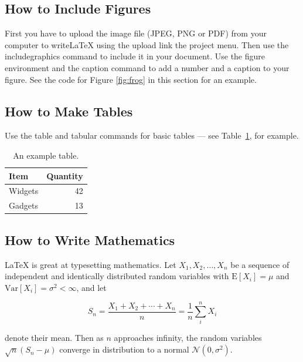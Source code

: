 \documentclass[a4paper]{article}
\begin{document}
\subsection{How to Include Figures}

First you have to upload the image file (JPEG, PNG or PDF) from your computer to writeLaTeX using the upload link the project menu. Then use the includegraphics command to include it in your document. Use the figure environment and the caption command to add a number and a caption to your figure. See the code for Figure \ref{fig:frog} in this section for an example.


\subsection{How to Make Tables}

Use the table and tabular commands for basic tables --- see Table~\ref{tab:widgets}, for example.

\begin{table}
\centering
\begin{tabular}{l|r}
Item & Quantity \\\hline
Widgets & 42 \\
Gadgets & 13
\end{tabular}
\caption{\label{tab:widgets}An example table.}
\end{table}

\subsection{How to Write Mathematics}

\LaTeX{} is great at typesetting mathematics. Let $X_1, X_2, \ldots, X_n$ be a sequence of independent and identically distributed random variables with $\text{E}[X_i] = \mu$ and $\text{Var}[X_i] = \sigma^2 < \infty$, and let

\begin{equation}
S_n = \frac{X_1 + X_2 + \cdots + X_n}{n}
      = \frac{1}{n}\sum_{i}^{n} X_i
\label{eq:sn}
\end{equation}

denote their mean. Then as $n$ approaches infinity, the random variables $\sqrt{n}(S_n - \mu)$ converge in distribution to a normal $\mathcal{N}(0, \sigma^2)$.
\end{document}
